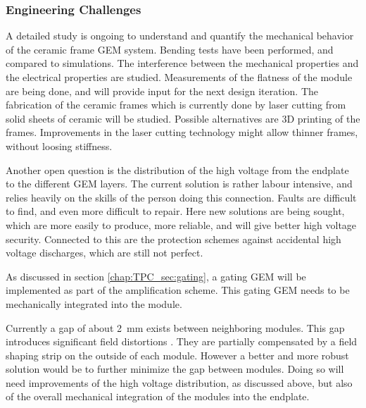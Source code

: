 \subsubsection{Engineering Challenges}
A detailed study is ongoing to understand and quantify the mechanical behavior of the ceramic frame GEM system. Bending tests have been performed, and compared to simulations. The interference between the mechanical properties and the electrical properties are studied. Measurements of the flatness of the module are being done, and will provide input for the next design iteration.
The fabrication of the ceramic frames which is currently done by laser cutting from solid sheets of ceramic will be studied. Possible alternatives are 3D printing of the frames. Improvements in the laser cutting technology might allow thinner frames, without loosing stiffness.

Another open question is the distribution of the high voltage from the endplate to the different GEM layers. The current solution is rather labour intensive, and relies heavily on the skills of the person doing this connection. Faults are difficult to find, and even more difficult to repair. Here new solutions are being sought, which are more easily to produce, more reliable, and will give better high voltage security. Connected to this are the protection schemes against accidental high voltage discharges, which are still not perfect.

As discussed in section \ref{chap:TPC_sec:gating}, a gating GEM will be implemented as part of the amplification scheme. This gating GEM needs to be mechanically integrated into the module.

Currently a gap of about \SI{2}{mm} exists between neighboring modules. This gap introduces significant field distortions \cite{Zenker:2014qra}. They are partially compensated by a field shaping strip on the outside of each module. However a better and more robust solution would be to further minimize the gap between modules. Doing so will need improvements of the high voltage distribution, as discussed above, but also of the overall mechanical integration of the modules into the endplate.

